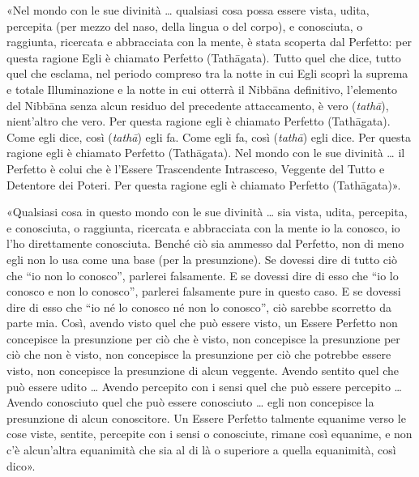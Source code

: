 «Nel mondo con le sue divinità … qualsiasi cosa possa essere vista, udita,
percepita (per mezzo del naso, della lingua o del corpo), e conosciuta, o
raggiunta, ricercata e abbracciata con la mente, è stata scoperta dal Perfetto:
per questa ragione Egli è chiamato Perfetto (Tathāgata). Tutto quel che dice,
tutto quel che esclama, nel periodo compreso tra la notte in cui Egli scoprì la
suprema e totale Illuminazione e la notte in cui otterrà il Nibbāna definitivo,
l’elemento del Nibbāna senza alcun residuo del precedente attaccamento, è vero
(\emph{tathā}), nient’altro che vero. Per questa ragione egli è chiamato
Perfetto (Tathāgata). Come egli dice, così (\emph{tathā}) egli fa. Come egli fa,
così (\emph{tathā}) egli dice. Per questa ragione egli è chiamato Perfetto
(Tathāgata). Nel mondo con le sue divinità … il Perfetto è colui che è l’Essere
Trascendente Intrasceso, Veggente del Tutto e Detentore dei Poteri. Per questa
ragione egli è chiamato Perfetto (Tathāgata)».


«Qualsiasi cosa in questo mondo con le sue divinità … sia vista, udita,
percepita, e conosciuta, o raggiunta, ricercata e abbracciata con la mente io la
conosco, io l’ho direttamente conosciuta. Benché ciò sia ammesso dal Perfetto,
non di meno egli non lo usa come una base (per la presunzione). Se dovessi dire
di tutto ciò che “io non lo conosco”, parlerei falsamente. E se dovessi dire di
esso che “io lo conosco e non lo conosco”, parlerei falsamente pure in questo
caso. E se dovessi dire di esso che “io né lo conosco né non lo conosco”, ciò
sarebbe scorretto da parte mia. Così, avendo visto quel che può essere visto, un
Essere Perfetto non concepisce la presunzione
per ciò che è visto, non concepisce la presunzione per ciò che non è visto, non
concepisce la presunzione per ciò che potrebbe essere visto, non concepisce la
presunzione di alcun veggente. Avendo sentito quel che può essere udito … Avendo
percepito con i sensi quel che può essere percepito … Avendo conosciuto quel che
può essere conosciuto … egli non concepisce la presunzione di alcun conoscitore.
Un Essere Perfetto talmente equanime verso le cose viste, sentite, percepite con
i sensi o conosciute, rimane così equanime, e non c’è alcun’altra equanimità che
sia al di là o superiore a quella equanimità, così dico».

